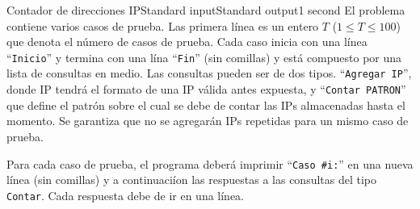 \begin{problem}{Contador de direcciones IP}{Standard input}{Standard output}{1 second}{}
\InputFile
El problema contiene varios casos de prueba. Las primera l\'inea es un entero $T$ ($1 \leq T \leq 100$) que denota el n\'umero de casos de prueba. Cada caso inicia con una l\'inea ``\texttt{Inicio}'' y termina con una l\'ina ``\texttt{Fin}'' (sin comillas) y está compuesto por una lista de consultas en medio. Las consultas pueden ser de dos tipos. ``\texttt{Agregar IP}'', donde IP tendr\'a el formato de una IP v\'alida antes expuesta, y ``\texttt{Contar PATRON}'' que define el patr\'on sobre el cual se debe de contar las IPs almacenadas hasta el momento. Se garantiza que no se agregar\'an IPs repetidas para un mismo caso de prueba.

\OutputFile
Para cada caso de prueba, el programa deber\'a imprimir ``\texttt{Caso \#i:}'' en una nueva l\'inea (sin comillas) y a continuaci\'ion las respuestas a las consultas del tipo \texttt{Contar}. Cada respuesta debe de ir en una l\'inea.

\Example

\begin{example}
\end{example}

\end{problem}
